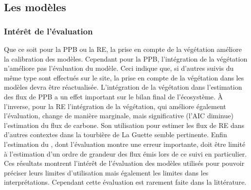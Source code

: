 

\subsection*{Les modèles}

\subsubsection{Intérêt de l'évaluation}


Que ce soit pour la PPB ou la RE, la prise en compte de la végétation améliore la calibration des modèles.
Cependant pour la PPB, l'intégration de la végétation n'améliore pas l'évaluation du modèle.
Ceci indique que, si d'autres suivis du même type sont effectués sur le site, la prise en compte de la végétation dans les modèles devra être réactualisée.
L'intégration de la végétation dans l'estimation des flux de PPB a un effet important sur le bilan final de l'écosystème.
À l'inverse, pour la RE l'intégration de la végétation, qui améliore également l'évaluation, change de manière marginale, mais significative (l'AIC diminue) l'estimation du flux de carbone.
Son utilisation pour estimer les flux de RE dans d'autres contextes dans la tourbière de La Guette semble pertinente.
Enfin l'estimation du \chh, dont l'évaluation montre une erreur importante, doit être limité à l'estimation d'un ordre de grandeur des flux émis lors de ce suivi en particulier.
Ces résultats montrent l'intérêt de l'évaluation des modèles utilisés pour pouvoir préciser leurs limites d'utilisation mais également les limites dans les interprétations.
Cependant cette évaluation est rarement faite dans la littérature.

